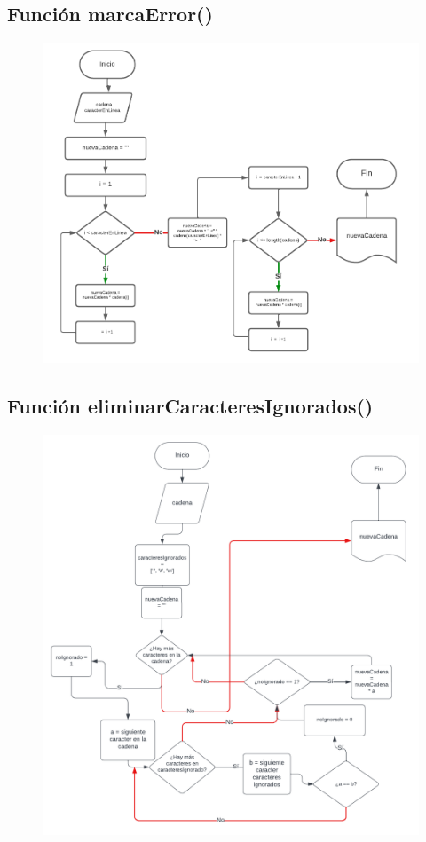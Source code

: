 \documentclass{article}
\begin{document}
\subsection{Función marcaError()}
\begin{figure}[h] 
	\centering 	\includegraphics[width=1.25\linewidth]{Función marcaError.png}
	\label{fig:Gráfica 3}
\end{figure}

\pagebreak
\subsection{Función eliminarCaracteresIgnorados()}
\begin{figure}[h] 
	\centering 	\includegraphics[width=1\linewidth]{Función eliminarCaracteresIgnorados.png}
	\label{fig:Gráfica 3}
\end{figure}
\end{document}
